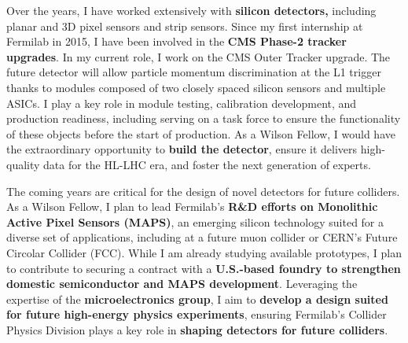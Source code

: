 {\begin{flushleft}
Over the years, I have worked extensively with {\bf silicon detectors,} including planar and 3D pixel sensors and strip sensors. Since my first internship at Fermilab in 2015, I have been involved in the {\bf CMS Phase-2 tracker upgrades}. In my current role, I work on the CMS Outer Tracker upgrade. The future detector will allow particle momentum discrimination at the L1 trigger thanks to modules composed of two closely spaced silicon sensors and multiple ASICs. I play a key role in module testing, calibration development, and production readiness, including serving on a task force to ensure the functionality of these objects before the start of production. As a Wilson Fellow, I would have the extraordinary opportunity to {\bf build the detector}, ensure it delivers high-quality data for the HL-LHC era, and foster the next generation of experts.


The coming years are critical for the design of novel detectors for future colliders. As a Wilson Fellow, I plan to lead Fermilab’s {\bf R\&D efforts on Monolithic Active Pixel Sensors (MAPS)}, an emerging silicon technology suited for a diverse set of applications, including at a future muon collider or CERN's Future Circolar Collider (FCC). While I am already studying available prototypes, I plan to contribute to securing a contract with a {\bf U.S.-based foundry to strengthen domestic semiconductor and MAPS development}. Leveraging the expertise of the {\bf microelectronics group}, I aim to {\bf develop a design suited for future high-energy physics experiments}, ensuring Fermilab’s Collider Physics Division plays a key role in {\bf shaping detectors for future colliders}.



\end{flushleft}}
